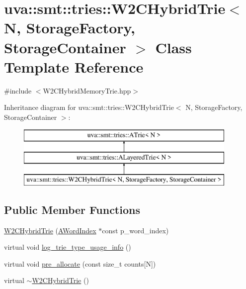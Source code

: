 \hypertarget{classuva_1_1smt_1_1tries_1_1_w2_c_hybrid_trie}{}\section{uva\+:\+:smt\+:\+:tries\+:\+:W2\+C\+Hybrid\+Trie$<$ N, Storage\+Factory, Storage\+Container $>$ Class Template Reference}
\label{classuva_1_1smt_1_1tries_1_1_w2_c_hybrid_trie}


{\ttfamily \#include $<$W2\+C\+Hybrid\+Memory\+Trie.\+hpp$>$}

Inheritance diagram for uva\+:\+:smt\+:\+:tries\+:\+:W2\+C\+Hybrid\+Trie$<$ N, Storage\+Factory, Storage\+Container $>$\+:\begin{figure}[H]
\begin{center}
\leavevmode
\includegraphics[height=3.000000cm]{classuva_1_1smt_1_1tries_1_1_w2_c_hybrid_trie}
\end{center}
\end{figure}
\subsection*{Public Member Functions}
\begin{DoxyCompactItemize}
\item 
\hyperlink{classuva_1_1smt_1_1tries_1_1_w2_c_hybrid_trie_aaeb703bad005acd84483bf085ae94992}{W2\+C\+Hybrid\+Trie} (\hyperlink{classuva_1_1smt_1_1tries_1_1dictionary_1_1_a_word_index}{A\+Word\+Index} $\ast$const p\+\_\+word\+\_\+index)
\item 
virtual void \hyperlink{classuva_1_1smt_1_1tries_1_1_w2_c_hybrid_trie_acfd9364a101a2ed142096fe91265d407}{log\+\_\+trie\+\_\+type\+\_\+usage\+\_\+info} ()
\item 
virtual void \hyperlink{classuva_1_1smt_1_1tries_1_1_w2_c_hybrid_trie_abc1e576b9bbd934e0b4bd702b1b5b3f1}{pre\+\_\+allocate} (const size\+\_\+t counts\mbox{[}N\mbox{]})
\item 
virtual \hyperlink{classuva_1_1smt_1_1tries_1_1_w2_c_hybrid_trie_a254fa371f69f827cafb20f17aa206dbc}{$\sim$\+W2\+C\+Hybrid\+Trie} ()
\end{DoxyCompactItemize}
